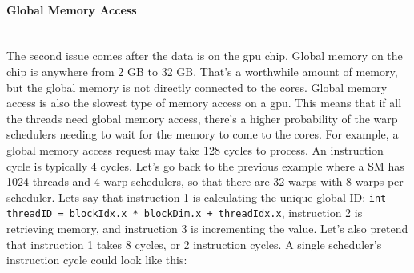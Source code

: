\paragraph{Global Memory Access} \hspace{0pt} \\
\indent The second issue comes after the data is on the \gls{gpu} chip. Global memory on the chip is anywhere from 2 GB to 32 GB. That's a worthwhile amount of memory, but the global memory is not directly connected to the cores. Global memory access is also the slowest type of memory access on a \gls{gpu}. This means that if all the threads need global memory access, there's a higher probability of the warp schedulers needing to wait for the memory to come to the cores. For example, a global memory access request may take 128 cycles to process. An instruction cycle is typically 4 cycles. Let's go back to the previous example where a SM has 1024 threads and 4 warp schedulers, so that there are 32 warps with 8 warps per scheduler. Lets say that instruction 1 is calculating the unique global ID: \verb|int threadID = blockIdx.x * blockDim.x + threadIdx.x|, instruction 2 is retrieving memory, and instruction 3 is incrementing the value. Let's also pretend that instruction 1 takes 8 cycles, or 2 instruction cycles. A single scheduler's instruction cycle could look like this:
\newpage
